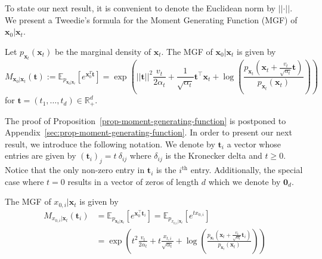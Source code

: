 %
%
To state our next result, it is convenient to denote the Euclidean norm by $\vert\vert\cdot\vert\vert$. We present a Tweedie's formula for the Moment Generating Function (MGF) of $\mathbf{x}_{0}\vert\mathbf{x}_{t}$.
\begin{proposition}
\label{prop-moment-generating-function}
Let $p_{\mathbf{x}_t}(\mathbf{x}_{t})$ be the marginal density of $\mathbf{x}_t$. The MGF of $\mathbf{x}_{0}\vert \mathbf{x}_{t}$ is given by 
\begin{equation}
\label{eq-moment-generating-function-tweedie}
    M_{\mathbf{x}_{0}\vert\mathbf{x}_{t}}(\mathbf{t}) := \mathbb{E}_{p_{\mathbf{x}_{0}\vert\mathbf{x}_{t}}}[e^{\mathbf{x}_0^T \mathbf{t}}] = \exp\left(||\mathbf{t}||^2\frac{v_{t}}{2\alpha_{t}} + \frac{1}{\sqrt{\alpha_{t}}}\mathbf{t}^{\top}\mathbf{x}_{t} + \log\left(\frac{p_{\mathbf{x}_{t}}\left(\mathbf{x}_{t}+\frac{v_{t}}{\sqrt{\alpha_t}}\mathbf{t}\right)}{p_{\mathbf{x}_{t}}\left(\mathbf{x}_{t}\right)}\right)\right)
\end{equation}
for $\mathbf{t}=(t_{1},\ldots,t_{d})\in\mathbb{R}_{+}^{d}$.
\end{proposition}
The proof of Proposition~\ref{prop-moment-generating-function} is postponed to Appendix~\ref{sec:prop-moment-generating-function}. 
%
%
In order to present our next result, we introduce the following notation. We denote by $\mathbf{t}_{i}$ a vector whose entries are given by $(\mathbf{t}_{i})_{j} = t \: \delta_{ij}$ where $\delta_{ij}$ is the Kronecker delta and $t\geq 0$. Notice that the only non-zero entry in $\mathbf{t}_i$ is the $i^{\text{th}}$ entry. Additionally, the special case where $t = 0$ results in a vector of zeros of length $d$ which we denote by $\mathbf{0}_d$.
\begin{corollary} \label{corollary:moment-generating-function-i}
The MGF of ${x}_{0,i}\vert\mathbf{x}_{t}$ is given by
\begin{equation}
\begin{aligned}
\label{eq-one-d-mgf}
   M_{{x}_{0,i}\vert\mathbf{x}_{t}}(\mathbf{t}_{i}) 
   &= \mathbb{E}_{p_{\mathbf{x}_0\vert \mathbf{x}_t}}[e^{\mathbf{x}_{0}^{\top} \mathbf{t}_{i}}] = \mathbb{E}_{p_{{x}_{0,i}\vert \mathbf{x}_t}}[e^{tx_{0,i}}] \\
   &= \exp\left(t^{2}\frac{v_{t}}{2\alpha_{t}} + t \frac{x_{t,i}}{ \sqrt{\alpha_{t}}}  + \log\left(\frac{p_{\mathbf{x}_t}\left(\mathbf{x}_{t}+\frac{v_{t}}{\sqrt{\alpha_t}}\mathbf{t}_{i}\right)}{p_{\mathbf{x}_t}\left(\mathbf{x}_{t}\right)}\right)\right)
\end{aligned}
\end{equation}
\end{corollary}
